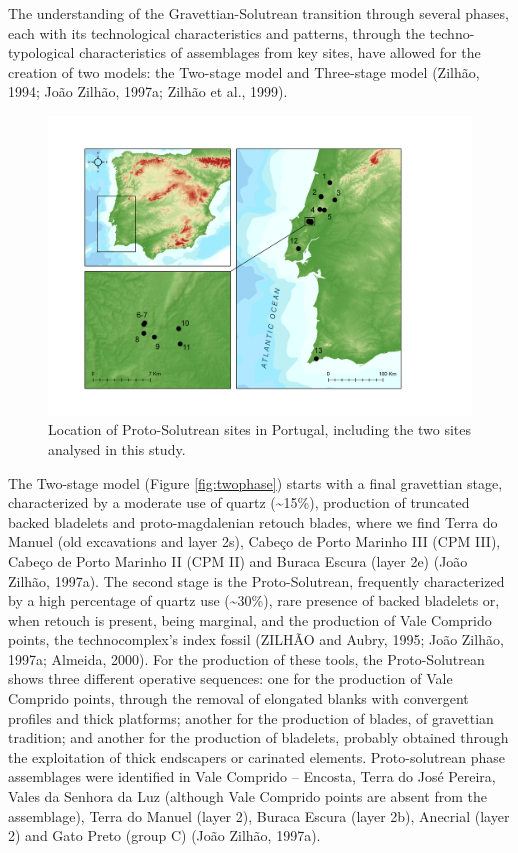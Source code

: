 \documentclass[12pt,twoside]{reedthesis}
\begin{document}
The understanding of the Gravettian-Solutrean transition through several phases, each with its technological characteristics and patterns, through the techno-typological characteristics of assemblages from key sites, have allowed for the creation of two models: the Two-stage model and Three-stage model (Zilhão, 1994; João Zilhão, 1997a; Zilhão et al., 1999).
\begin{figure}[H]

{\centering \includegraphics[width=0.8\linewidth]{figure/map_proto_solutrean} 

}

\caption{Location of Proto-Solutrean sites in Portugal, including the two sites analysed in this study.}\label{fig:protomap}
\end{figure}
The Two-stage model (Figure \ref{fig:twophase}) starts with a final gravettian stage, characterized by a moderate use of quartz (\textasciitilde15\%), production of truncated backed bladelets and proto-magdalenian retouch blades, where we find Terra do Manuel (old excavations and layer 2s), Cabeço de Porto Marinho III (CPM III), Cabeço de Porto Marinho II (CPM II) and Buraca Escura (layer 2e) (João Zilhão, 1997a). The second stage is the Proto-Solutrean, frequently characterized by a high percentage of quartz use (\textasciitilde30\%), rare presence of backed bladelets or, when retouch is present, being marginal, and the production of Vale Comprido points, the technocomplex's index fossil (ZILHÃO and Aubry, 1995; João Zilhão, 1997a; Almeida, 2000). For the production of these tools, the Proto-Solutrean shows three different operative sequences: one for the production of Vale Comprido points, through the removal of elongated blanks with convergent profiles and thick platforms; another for the production of blades, of gravettian tradition; and another for the production of bladelets, probably obtained through the exploitation of thick endscapers or carinated elements. Proto-solutrean phase assemblages were identified in Vale Comprido -- Encosta, Terra do José Pereira, Vales da Senhora da Luz (although Vale Comprido points are absent from the assemblage), Terra do Manuel (layer 2), Buraca Escura (layer 2b), Anecrial (layer 2) and Gato Preto (group C) (João Zilhão, 1997a).
\end{document}

